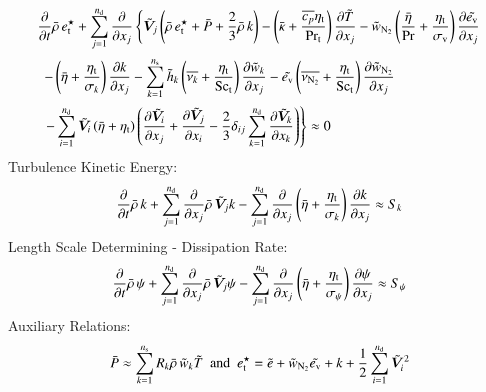 \documentclass{warpdoc}
\newcommand{\alb}{\vspace{0.2cm}\\} %
\newcommand{\Cp}{{c_{p}}}
\newcommand{\Sct}{{{\rm Sc}_{\rm t}}}
\newcommand{\Prt}{{{\rm Pr}_{\rm t}}}
\newcommand{\nd}{{{n}_{\rm d}}}
\newcommand{\ns}{{{n}_{\rm s}}}
\newcommand{\turb}{_{\rm t}}
\newcommand{\etat}{{\eta\turb}}
\newcommand{\mfd}{\displaystyle}
\newcommand{\ev}{e_{\rm v}}
\newcommand{\sigmav}{\sigma_{\rm v}}
\newcommand{\etstar}{{e_{\rm t}^\star}}
\begin{document}
\begin{displaymath}
 \begin{array}{l}
    \mfd\frac{\partial}{\partial t}  \wbar{\rho}\, \etstar
     + \sum_{j=1}^{\nd} \frac{\partial}{\partial x_j} \left\{ {\wtilde{\bm{V}}_j}
       \left(
            \wbar{\rho}\, \etstar
            +\wbar{P}
            +\frac{2}{3} \wbar{\rho}\, k
       \right)
    -\left( \wbar{\kappa}+\frac{\overline{\Cp} \etat}{\Prt} \right)
       \frac{\partial \wtilde{T}}{\partial x_j}
    - {\wtilde{w}_{\rm N_2}} \left( \frac{\wbar{\eta}}{\Pr}+\frac{ \etat}{\sigmav} \right) \frac{\partial {\wtilde{\ev}}}{\partial x_j}\right.\alb\mfd~~
        -\left( \wbar{\eta}+\frac{\etat}{\sigma_k} \right) \frac{\partial k}{\partial x_j}
    -\sum_{k=1}^{\ns}
          {\wtilde{h}_k} 
            \left( \overline{\nu_k}+\frac{\etat}{\Sct} \right)
               \frac{\partial {\wtilde{w}_k}}{\partial x_j}
- {\wtilde{\ev}} \left( \overline{\nu_{\rm N_2} }+\frac{\etat}{\Sct} \right) \frac{\partial {\wtilde{w}_{\rm N_2}}}{\partial x_j}
       \alb~~
    \mfd \left. -\sum_{i=1}^{\nd}
         {\wtilde{\bm{V}}_i} 
            \left(\wbar{\eta}+\etat\right) \left(
               \frac{\partial {\wtilde{\bm{V}}_i}}{\partial x_j}
               +\frac{\partial {\wtilde{\bm{V}}_j}}{\partial x_i}
               -\frac{2}{3} \delta_{ij} \sum_{k=1}^\nd \frac{\partial {\wtilde{\bm{V}}_k}}{\partial x_k}
            \right)
      \right\}
      \approx 0
 \end{array}
\end{displaymath}
%
%
Turbulence Kinetic Energy:
\begin{displaymath}
    \frac{\partial }{\partial t} \wbar{\rho}\, k
   +  \sum_{j=1}^{\nd}\frac{\partial }{\partial x_j} \wbar{\rho}\, {\wtilde{\bm{V}}_j} k
   - \sum_{j=1}^{\nd} \frac{\partial }{\partial x_j}
     \left( \wbar{\eta}+\frac{\etat}{\sigma_k} \right) \frac{\partial k}{\partial x_j}
   \approx 
  S_k
\end{displaymath}
%
%
Length Scale Determining - Dissipation Rate:
\begin{displaymath}
 \begin{array}{r}
         \mfd \frac{\partial }{\partial t} \wbar{\rho}\, \psi
        +\mfd\sum_{j=1}^{\nd}
           \frac{\partial }{\partial x_j} \wbar{\rho}\, {\wtilde{\bm{V}}_j} \psi
        -\sum_{j=1}^\nd \frac{\partial }{\partial x_j} \left( \wbar{\eta} +\frac{\etat}{\sigma_{\psi}} \right)\frac{\partial \psi}{\partial x_j}
 \approx 
 S_\psi
 \end{array}
\end{displaymath}
%
Auxiliary Relations:
\begin{displaymath}
 \wbar{P}
     \approx   \sum_{k=1}^\ns R_k \wbar{\rho}\,  {\wtilde{w}_k} \wtilde{T}
 {    \rm ~~and~~     }
 \etstar =  \wtilde{e}+{\wtilde{w}_{\rm N_2}}{\wtilde{\ev}} +k+\frac{1}{2} \sum_{i=1}^\nd {\wtilde{\bm{V}}_i}^2
\end{displaymath}
\end{document}
